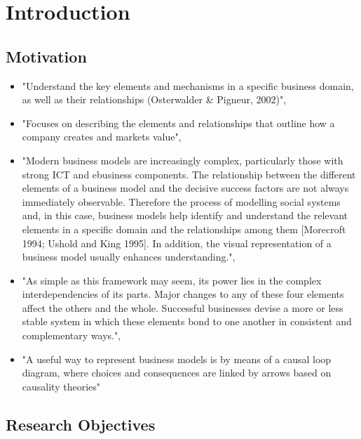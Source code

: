 \chapter{Introduction}\label{ch:intro}

\section{Motivation}

\begin{itemize}
	\item "Understand the key elements and mechanisms in a specific business domain, as well as their relationships (Osterwalder \& Pigneur, 2002)", \citep[p. 303]{Pateli2004}
	\item "Focuses on describing the elements and relationships that outline how a company creates and markets value", \citep[p. 7]{Osterwalder2005}
	\item "Modern business models are increasingly complex, particularly those with strong ICT and ebusiness components. The relationship between the different elements of a business model and the decisive success factors are not always immediately observable. Therefore the process of modelling social systems and, in this case, business models help identify and understand the relevant elements in a specific domain and the relationships among them [Morecroft 1994; Ushold and King 1995]. In addition, the visual representation of a business model usually enhances understanding.", \citep[p. 14]{Osterwalder2005}
	\item "As simple as this framework may seem, its power lies in the complex interdependencies of its parts. Major changes to any of these four elements affect the others and the whole. Successful businesses devise a more or less stable system in which these elements bond to one another in consistent and complementary ways.", \citep[p. 53]{Johnson2008}
	\item "A useful way to represent business models is by means of a causal loop diagram, where choices and consequences are linked by arrows based on causality theories" \citep[p. 198]{Casadesus-Masanell2010}
\end{itemize}


\section{Research Objectives}


